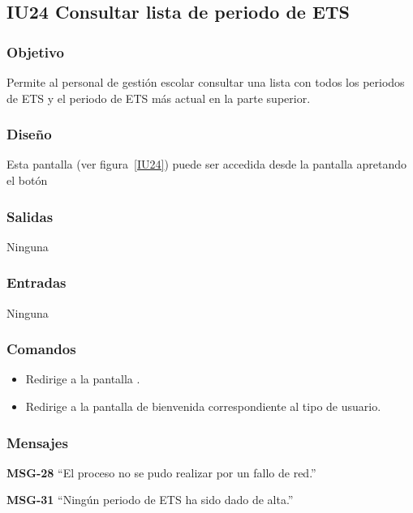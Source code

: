 
\subsection{IU24 Consultar lista de periodo de ETS}
\subsubsection{Objetivo}
   Permite al personal de gestión escolar consultar una lista con todos los periodos de ETS y el periodo de ETS más actual en la parte superior.
\subsubsection{Diseño}
    Esta pantalla  (ver figura~\ref{IU24}) puede ser accedida desde la pantalla  apretando el botón 

\subsubsection{Salidas}
Ninguna
\subsubsection{Entradas}
Ninguna
\subsubsection{Comandos}
\begin{itemize}
    \item {} Redirige a la pantalla .
    \item {} Redirige a la pantalla de bienvenida correspondiente al tipo de usuario.
    
\end{itemize}

\subsubsection{Mensajes}

\begin{Citemize}
    \item {\bf MSG-28}  ``El proceso no se pudo realizar por un fallo de red.''
    \item {\bf MSG-31}  ``Ningún periodo de ETS ha sido dado de alta.''
\end{Citemize}


